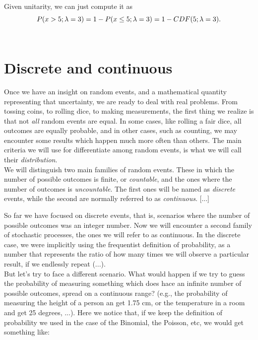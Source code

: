 \documentclass{book}
\begin{document}
Given unitarity, we can just compute it as
\begin{equation}
    P(x > 5; \lambda = 3) = 1 - P(x \leq 5; \lambda = 3) = 1 - CDF(5; \lambda = 3). \notag
\end{equation}\\

\section{Discrete and continuous}

Once we have an insight on random events, and a mathematical quantity representing that uncertainty, we are ready to deal with real problems. From tossing coins, to rolling dice, to making measurements, the first thing we realize is that not \textit{all} random events are equal. In some cases, like rolling a fair dice, all outcomes are equally probable, and in other cases, such as counting, we may encounter some results which happen much more often than others. The main criteria we will use for differentiate among random events, is what we will call their \textit{distribution}.\\

We will distinguish two main families of random events. These in which the number of possible outcomes is finite, or \textit{countable}, and the ones where the number of outcomes is \textit{uncountable}. The first ones will be named as \textit{discrete} events, while the second are normally referred to as \textit{continuous}. [...]

So far we have focused on discrete events, that is, scenarios where the number of possible outcomes was an integer number. Now we will encounter a second family of stochastic processes, the ones we will refer to as continuous. In the discrete case, we were implicitly using the frequentist definition of probability, as a number that represents the ratio of how many times we will observe a particular result, if we endlessly repeat (...).\\

But let's try to face a different scenario. What would happen if we try to guess the probability of measuring something which does hace an infinite number of possible outcomes, spread on a continuous range? (e.g., the probability of measuring the height of a person an get 1.75 cm, or the temperature in a room and get 25 degrees, ...). Here we notice that, if we keep the definition of probability we used in the case of the Binomial, the Poisson, etc, we would get something like:
\end{document}

